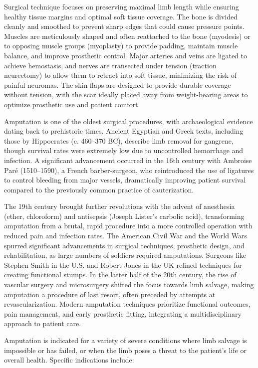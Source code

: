 Surgical technique focuses on preserving maximal limb length while ensuring healthy tissue margins and optimal soft tissue coverage. The bone is divided cleanly and smoothed to prevent sharp edges that could cause pressure points. Muscles are meticulously shaped and often reattached to the bone (myodesis) or to opposing muscle groups (myoplasty) to provide padding, maintain muscle balance, and improve prosthetic control. Major arteries and veins are ligated to achieve hemostasis, and nerves are transected under tension (traction neurectomy) to allow them to retract into soft tissue, minimizing the risk of painful neuromas. The skin flaps are designed to provide durable coverage without tension, with the scar ideally placed away from weight-bearing areas to optimize prosthetic use and patient comfort.

Amputation is one of the oldest surgical procedures, with archaeological evidence dating back to prehistoric times. Ancient Egyptian and Greek texts, including those by Hippocrates (c. 460--370 BC), describe limb removal for gangrene, though survival rates were extremely low due to uncontrolled hemorrhage and infection. A significant advancement occurred in the 16th century with Ambroise Par\'e (1510--1590), a French barber-surgeon, who reintroduced the use of ligatures to control bleeding from major vessels, dramatically improving patient survival compared to the previously common practice of cauterization.

The 19th century brought further revolutions with the advent of anesthesia (ether, chloroform) and antisepsis (Joseph Lister's carbolic acid), transforming amputation from a brutal, rapid procedure into a more controlled operation with reduced pain and infection rates. The American Civil War and the World Wars spurred significant advancements in surgical techniques, prosthetic design, and rehabilitation, as large numbers of soldiers required amputations. Surgeons like Stephen Smith in the U.S. and Robert Jones in the UK refined techniques for creating functional stumps. In the latter half of the 20th century, the rise of vascular surgery and microsurgery shifted the focus towards limb salvage, making amputation a procedure of last resort, often preceded by attempts at revascularization. Modern amputation techniques prioritize functional outcomes, pain management, and early prosthetic fitting, integrating a multidisciplinary approach to patient care.

Amputation is indicated for a variety of severe conditions where limb salvage is impossible or has failed, or when the limb poses a threat to the patient's life or overall health. Specific indications include:


